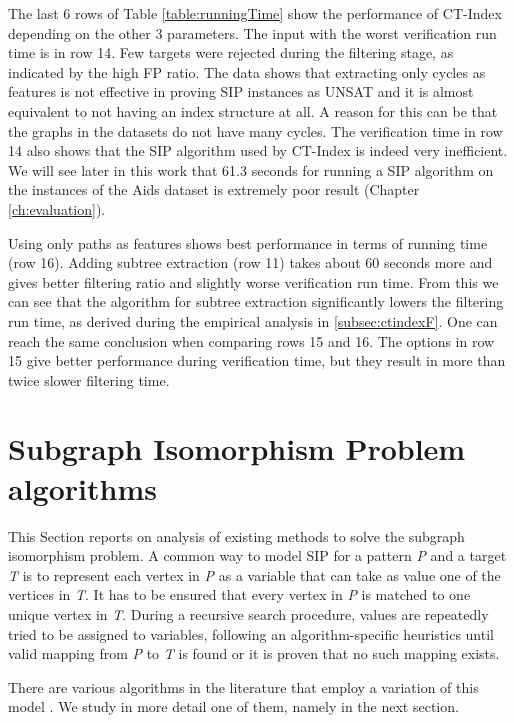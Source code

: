 \documentclass{l4proj}
\begin{document}
The last 6 rows of Table \ref{table:runningTime} show the performance of CT-Index depending on the other 3 parameters. The input with the worst verification run time is in row 14. Few targets were rejected during the filtering stage, as indicated by the high FP ratio. The data shows that extracting only cycles as features is not effective in proving SIP instances as UNSAT and it is almost equivalent to not having an index structure at all. A reason for this can be that the graphs in the datasets do not have many cycles. The verification time in row 14 also shows that the SIP algorithm used by CT-Index is indeed very inefficient. We will see later in this work that 61.3 seconds for running a SIP algorithm on the instances of the Aids dataset is extremely poor result (Chapter \ref{ch:evaluation}).

Using only paths as features shows best performance in terms of running time (row 16). Adding subtree extraction (row 11) takes about 60 seconds more and gives better filtering ratio and slightly worse verification run time. From this we can see that the algorithm for subtree extraction significantly lowers the filtering run time, as derived during the empirical analysis in \ref{subsec:ctindexF}. One can reach the same conclusion when comparing rows 15 and 16. The options in row 15 give better performance during verification time, but they result in more than twice slower filtering time.


\section{Subgraph Isomorphism Problem algorithms}
This Section reports on analysis of existing methods to solve the subgraph isomorphism problem. A common way to model SIP for a pattern \emph{P} and a target \emph{T} is to represent each vertex in \emph{P} as a variable that can take as value one of the vertices in \emph{T}. It has to be ensured that every vertex in \emph{P} is matched to one unique vertex in \emph{T}. During a recursive search procedure, values are repeatedly tried to be assigned to variables, following an algorithm-specific heuristics until valid mapping from \emph{P} to \emph{T} is found or it is proven that no such mapping exists.
 
There are various algorithms in the literature that employ a variation of this model \cite{Solnon:2010, Ullmann:1976, Regin:1995, Larrosa:2002, Solnon:2010a, CP2015}. We study in more detail one of them, namely \cite{CP2015} in the next section.
\end{document}
